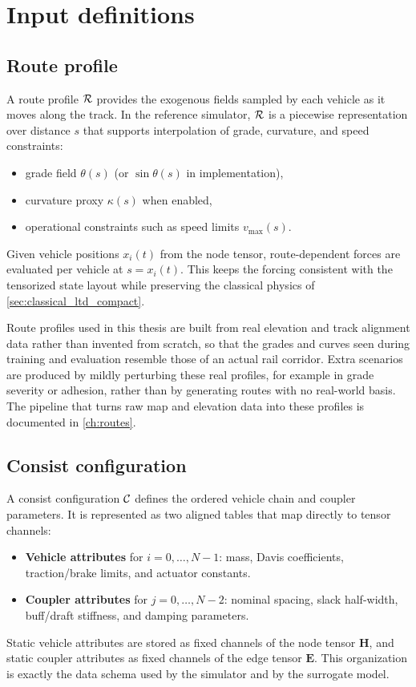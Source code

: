 \section{Input definitions}
\label{sec:input_definitions}

\subsection{Route profile}

A route profile $\mathcal{R}$ provides the exogenous fields sampled by each vehicle as it moves along the track.
In the reference simulator, $\mathcal{R}$ is a piecewise representation over distance $s$ that supports interpolation of grade, curvature, and speed constraints:
\begin{itemize}
    \item grade field $\theta(s)$ (or $\sin\theta(s)$ in implementation),
    \item curvature proxy $\kappa(s)$ when enabled,
    \item operational constraints such as speed limits $v_{\max}(s)$.
\end{itemize}
Given vehicle positions $x_i(t)$ from the node tensor, route-dependent forces are evaluated per vehicle at $s=x_i(t)$.
This keeps the forcing consistent with the tensorized state layout while preserving the classical physics of \cref{sec:classical_ltd_compact}.

Route profiles used in this thesis are built from real elevation and track alignment data rather than invented from scratch, so that the grades and curves seen during training and evaluation resemble those of an actual rail corridor.
Extra scenarios are produced by mildly perturbing these real profiles, for example in grade severity or adhesion, rather than by generating routes with no real-world basis.
The pipeline that turns raw map and elevation data into these profiles is documented in \cref{ch:routes}.

\subsection{Consist configuration}

A consist configuration $\mathcal{C}$ defines the ordered vehicle chain and coupler parameters.
It is represented as two aligned tables that map directly to tensor channels:
\begin{itemize}
    \item \textbf{Vehicle attributes} for $i=0,\ldots,N-1$: mass, Davis coefficients, traction/brake limits, and actuator constants.
    \item \textbf{Coupler attributes} for $j=0,\ldots,N-2$: nominal spacing, slack half-width, buff/draft stiffness, and damping parameters.
\end{itemize}
Static vehicle attributes are stored as fixed channels of the node tensor $\mathbf{H}$, and static coupler attributes as fixed channels of the edge tensor $\mathbf{E}$.
This organization is exactly the data schema used by the simulator and by the surrogate model.

